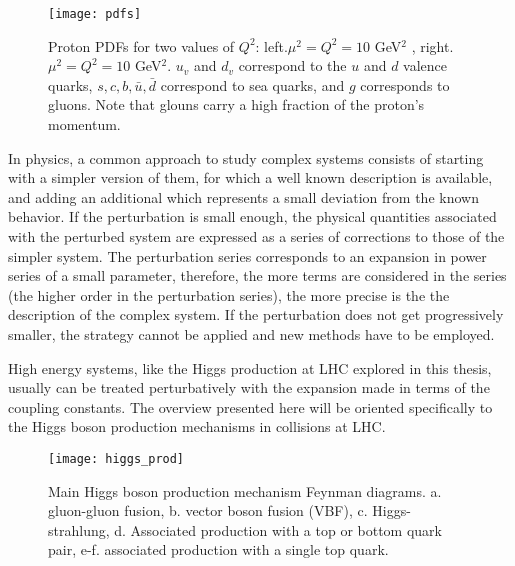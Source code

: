 \begin{figure}[!h]
\centering
\texttt{[image: pdfs]}
\caption[Proton PDFs]{Proton PDFs for two values of $Q^2$: left.$\mu^2=Q^2=10$ GeV$^2$ , right. $\mu^2=Q^2=10$ GeV$^2$. $u_v$ and $d_v$ correspond to the $u$ and $d$ valence quarks, $s, c, b, \bar{u}, \bar{d}$ correspond to sea quarks, and $g$ corresponds to gluons. Note that glouns carry a high fraction of the proton's momentum. \cite{pdg}}
\label{fig:pdfs}
\end{figure}

In physics, a common approach to study complex systems consists of starting with a simpler version of them, for which a well known description is available, and adding an additional  which represents a small deviation from the known behavior. If the perturbation is small enough, the physical quantities associated with the perturbed system are expressed as a series of corrections to those of the simpler system. The perturbation series corresponds to an expansion in power series of a small parameter, therefore, the more terms are considered in the series (the higher order in the perturbation series), the more precise is the the description of the complex system. If the perturbation does not get progressively smaller, the strategy cannot be applied and new methods have to be employed. 

High energy systems, like the Higgs production at LHC explored in this thesis, usually can be treated perturbatively with the expansion made in terms of the coupling constants. The overview presented here will be oriented specifically to the Higgs boson production mechanisms in \pp collisions at LHC.

\begin{figure}[!h]
\centering
\texttt{[image: higgs\_prod]}
\caption[Higgs boson production mechanism Feynman diagrams]{Main Higgs boson production mechanism Feynman diagrams. a. gluon-gluon fusion, b. vector boson fusion (VBF), c. Higgs-strahlung, d. Associated production with a top or bottom quark pair, e-f. associated production with a single top quark.}
\label{higgs_prod}
\end{figure}

